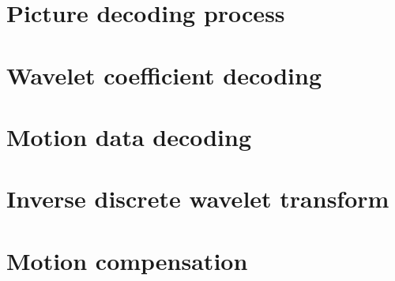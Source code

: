 
\section{Picture decoding process}

\clearpage
\section{Wavelet coefficient decoding}

\clearpage
\section{Motion data decoding}

\clearpage
\section{Inverse discrete wavelet transform}

\clearpage
\section{Motion compensation}
